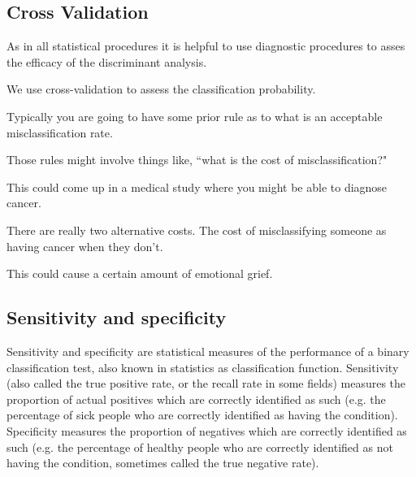 



\subsection*{Cross Validation}

As in all statistical procedures it is helpful to use diagnostic procedures to asses the efficacy of the discriminant analysis. 

We use cross-validation to assess the classification probability. 

Typically you are going to have some prior rule as to what is an acceptable misclassification rate. 

Those rules might involve things like, ``what is the cost of misclassification?" 

This could come up in a medical study where you might be able to diagnose cancer. 

There are really two alternative costs. The cost of misclassifying someone as having cancer when they don't. 

This could cause a certain amount of emotional grief.


\subsection*{Sensitivity and specificity}

Sensitivity and specificity are statistical measures of the performance of a binary classification test, also known in statistics as classification function. Sensitivity (also called the true positive rate, or the recall rate in some fields) measures the proportion of actual positives which are correctly identified as such (e.g. the percentage of sick people who are correctly identified as having the condition). Specificity measures the proportion of negatives which are correctly identified as such (e.g. the percentage of healthy people who are correctly identified as not having the condition, sometimes called the true negative rate). 

